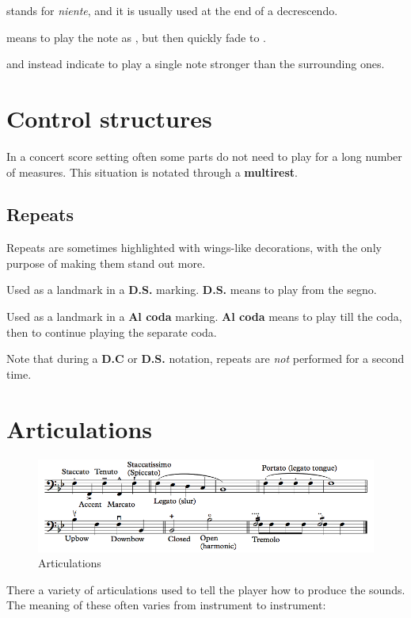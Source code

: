  stands for \emph{niente}, and it is usually used at the end of a decrescendo.

 means to play the note as , but then quickly fade to .

 and  instead indicate to play a single note stronger than the surrounding ones.

\section{Control structures}
In a concert score setting often some parts do not need to play for a long number of measures. This situation is notated through a \textbf{multirest}.

\subsection{Repeats}
Repeats are sometimes highlighted with wings-like decorations, with the only purpose of making them stand out more.

\begin{definition}[Segno]
    Used as a landmark in a \textbf{D.S.} marking. \textbf{D.S.} means to play from the segno.
\end{definition}

\begin{definition}[Coda]
    Used as a landmark in a \textbf{Al coda} marking. \textbf{Al coda} means to play till the coda, then to continue playing the separate coda.
\end{definition}

Note that during a \textbf{D.C} or \textbf{D.S.} notation, repeats are \emph{not} performed for a second time.

\section{Articulations}
\begin{figure}[h]
    \begin{center}
        \includegraphics[width=1\textwidth]{img/articulations}
        \caption{Articulations}
    \end{center}
\end{figure}
There a variety of articulations used to tell the player how to produce the sounds. The meaning of these often varies from instrument to instrument:

